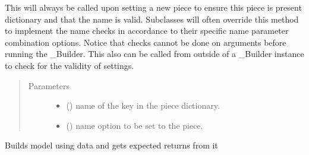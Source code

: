 \documentclass[letterpaper,10pt,english]{sphinxmanual}
\begin{document}
\begin{fulllineitems}
\begin{fulllineitems}
This will always be called upon setting a new piece to ensure this
piece is present dictionary and that the name is valid. Subclasses
will often override this method to implement the name checks in
accordance to their specific name parameter combination options.
Notice that checks cannot be done on arguments before running the
\_Builder. This also can be called from outside of a \_Builder instance
to check for the validity of settings.
\begin{quote}\begin{description}
\item[{Parameters}] \leavevmode\begin{itemize}
\item {} 
 () \textendash{} name of the key in the piece dictionary.

\item {} 
 () \textendash{} name option to be set to the piece.

\end{itemize}

\end{description}\end{quote}

\end{fulllineitems}


\begin{fulllineitems}
\label{\detokenize{dalio.pipe:dalio.pipe.builders.ExpectedReturns.transform}}
Builds model using data and gets expected returns from it

\end{fulllineitems}


\end{fulllineitems}

\end{document}

